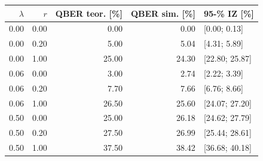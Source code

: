 \begin{tabular}{rrrrl}
\toprule
$\lambda$ & $r$ & QBER teor. [\%] & QBER sim. [\%] & 95-\% IZ [\%] \\
\midrule
\num{0.00} & \num{0.00} & \num{0.00} & \num{0.00} & [\num{0.00}; \num{0.13}] \\
\num{0.00} & \num{0.20} & \num{5.00} & \num{5.04} & [\num{4.31}; \num{5.89}] \\
\num{0.00} & \num{1.00} & \num{25.00} & \num{24.30} & [\num{22.80}; \num{25.87}] \\
\num{0.06} & \num{0.00} & \num{3.00} & \num{2.74} & [\num{2.22}; \num{3.39}] \\
\num{0.06} & \num{0.20} & \num{7.70} & \num{7.66} & [\num{6.76}; \num{8.66}] \\
\num{0.06} & \num{1.00} & \num{26.50} & \num{25.60} & [\num{24.07}; \num{27.20}] \\
\num{0.50} & \num{0.00} & \num{25.00} & \num{26.18} & [\num{24.62}; \num{27.79}] \\
\num{0.50} & \num{0.20} & \num{27.50} & \num{26.99} & [\num{25.44}; \num{28.61}] \\
\num{0.50} & \num{1.00} & \num{37.50} & \num{38.42} & [\num{36.68}; \num{40.18}] \\
\bottomrule
\end{tabular}
